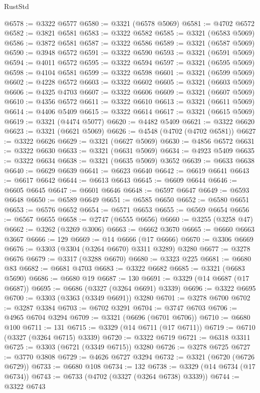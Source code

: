 \begin{lexlean}{RustStd}
\begin{coremodule}
@6578 := @3322 @6577
@6580 := @3321 (@6578 @5069)
@6581 := @4702 @6572
@6582 := @3821 @6581
@6583 := @3322 @6582
@6585 := @3321 (@6583 @5069)
@6586 := @3872 @6581
@6587 := @3322 @6586
@6589 := @3321 (@6587 @5069)
@6590 := @3948 @6572
@6591 := @3322 @6590
@6593 := @3321 (@6591 @5069)
@6594 := @4011 @6572
@6595 := @3322 @6594
@6597 := @3321 (@6595 @5069)
@6598 := @4104 @6581
@6599 := @3322 @6598
@6601 := @3321 (@6599 @5069)
@6602 := @4228 @6572
@6603 := @3322 @6602
@6605 := @3321 (@6603 @5069)
@6606 := @4325 @4703
@6607 := @3322 @6606
@6609 := @3321 (@6607 @5069)
@6610 := @4356 @6572
@6611 := @3322 @6610
@6613 := @3321 (@6611 @5069)
@6614 := @4406 @5409
@6615 := @3322 @6614
@6617 := @3321 (@6615 @5069)
@6619 := @3321 (@4474 @5077)
@6620 := @4482 @5409
@6621 := @3322 @6620
@6623 := @3321 (@6621 @5069)
@6626 := @4548 (@4702 (@4702 @6581))
@6627 := @3322 @6626
@6629 := @3321 (@6627 @5069)
@6630 := @4856 @6572
@6631 := @3322 @6630
@6633 := @3321 (@6631 @5069)
@6634 := @4923 @5409
@6635 := @3322 @6634
@6638 := @3321 (@6635 @5069) @3652
@6639 := @6633 @6638
@6640 := @6629 @6639
@6641 := @6623 @6640
@6642 := @6619 @6641
@6643 := @6617 @6642
@6644 := @6613 @6643
@6645 := @6609 @6644
@6646 := @6605 @6645
@6647 := @6601 @6646
@6648 := @6597 @6647
@6649 := @6593 @6648
@6650 := @6589 @6649
@6651 := @6585 @6650
@6652 := @6580 @6651
@6653 := @6576 @6652
@6654 := @6571 @6653
@6655 := @6569 @6654
@6656 := @6567 @6655
@6658 := @2747 (@6555 @6656)
@6660 := @3255 (@3258 @47)
@6662 := @3262 (@3269 @3006)
@6663 := @6662 @3670
@6665 := @6660 @6663 @3667
@6666 := 129
@6669 := @14 @6666 (@17 @6666)
@6670 := @3306 @6669
@6676 := @3303 (@3304 (@3264 @6670) @3311 @3289) @3280
@6677 := @3278 @6676
@6679 := @3317 (@3288 @6670)
@6680 := @3323 @225
@6681 := @6680 @83
@6682 := @6681 @4703
@6683 := @3322 @6682
@6685 := @3321 (@6683 @5690)
@6686 := @6680 @19
@6687 := 130
@6691 := @3329 (@14 @6687 (@17 @6687))
@6695 := @6686 (@3327 (@3264 @6691) @3339)
@6696 := @3322 @6695
@6700 := @3303 (@3363 (@3349 @6691)) @3280
@6701 := @3278 @6700
@6702 := @3287 @3384
@6703 := @6702 @3291
@6704 := @3747 @6703
@6706 := @4965 @6704 @3294
@6709 := @3321 (@6696 (@6701 @6706))
@6710 := @6680 @100
@6711 := 131
@6715 := @3329 (@14 @6711 (@17 @6711))
@6719 := @6710 (@3327 (@3264 @6715) @3339)
@6720 := @3322 @6719
@6721 := @6318 @3311
@6725 := @3303 (@6721 (@3349 @6715)) @3280
@6726 := @3278 @6725
@6727 := @3770 @3808
@6729 := @4626 @6727 @3294
@6732 := @3321 (@6720 (@6726 @6729))
@6733 := @6680 @108
@6734 := 132
@6738 := @3329 (@14 @6734 (@17 @6734))
@6743 := @6733 (@4702 (@3327 (@3264 @6738) @3339))
@6744 := @3322 @6743

\end{coremodule}
\end{lexlean}
